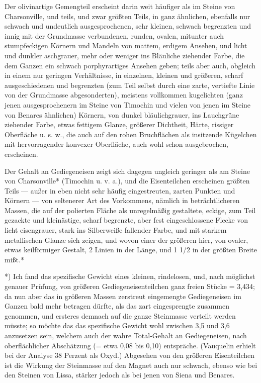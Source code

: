 \documentclass[a4paper, 11pt, oneside, german]{article}
\begin{document}
Der olivinartige Gemengteil erscheint darin weit häufiger als im Steine von Charsonville, und teils, und zwar größten Teils, in ganz ähnlichen, ebenfalls nur schwach und undeutlich ausgesprochenen, sehr kleinen, schwach begrenzten und innig mit der Grundmasse verbundenen, runden, ovalen, mitunter auch stumpfeckigen Körnern und Mandeln von mattem, erdigem Ansehen, und licht und dunkler aschgrauer, mehr oder weniger ins Bläuliche ziehender Farbe, die dem Ganzen ein schwach porphyrartiges Ansehen geben; teils aber auch, obgleich in einem nur geringen Verhältnisse, in einzelnen, kleinen und größeren, scharf ausgeschiedenen und begrenzten (zum Teil selbst durch eine zarte, vertiefte Linie von der Grundmasse abgesonderten), meistens vollkommen kugelichten (ganz jenen ausgesprochenern im Steine von Timochin und vielen von jenen im Steine von Benares ähnlichen) Körnern, von dunkel bläulichgrauer, ins Lauchgrüne ziehender Farbe, etwas fettigem Glanze, größerer Dichtheit, Härte, rissiger Oberfläche u. s. w., die auch auf den rohen Bruchflächen als insitzende Kügelchen mit hervorragender konvexer Oberfläche, auch wohl schon ausgebrochen, erscheinen.

Der Gehalt an Gediegeneisen zeigt sich dagegen ungleich geringer als am Steine von Charsonville* (Timochin u. v. a.), und die Eisenteilchen erscheinen größten Teils --- außer in eben nicht sehr häufig eingestreuten, zarten Punkten und Körnern --- von seltenerer Art des Vorkommens, nämlich in beträchtlicheren Massen, die auf der polierten Fläche als unregelmäßig gestaltete, eckige, zum Teil gezackte und kleinästige, scharf begrenzte, aber fest eingeschlossene Flecke von licht eisengrauer, stark ins Silberweiße fallender Farbe, und mit starkem metallischen Glanze sich zeigen, und wovon einer der größeren hier, von ovaler, etwas keilförmiger Gestalt, 2 Linien in der Länge, und 1 1/2 in der größten Breite mißt.*

*) Ich fand das spezifische Gewicht eines kleinen, rindelosen, und, nach möglichst genauer Prüfung, von größeren Gediegeneisenteilchen ganz freien Stücke = 3,434; da nun aber das in größeren Massen zerstreut eingemengte Gediegeneisen im Ganzen bald mehr betragen dürfte, als das zart eingesprengte zusammen genommen, und ersteres demnach auf die ganze Steinmasse verteilt werden müsste; so möchte das das spezifische Gewicht wohl zwischen 3,5 und 3,6 anzusetzen sein, welchem auch der wahre Total-Gehalt an Gediegeneisen, nach oberflächlicher Abschätzung (= etwa 0,08 bis 0,10) entspräche. (Vauquelin erhielt bei der Analyse 38 Perzent als Oxyd.) Abgesehen von den größeren Eisenteilchen ist die Wirkung der Steinmasse auf den Magnet auch nur schwach, ebenso wie bei den Steinen von Lissa, stärker jedoch als bei jenen von Siena und Benares.
\end{document}
